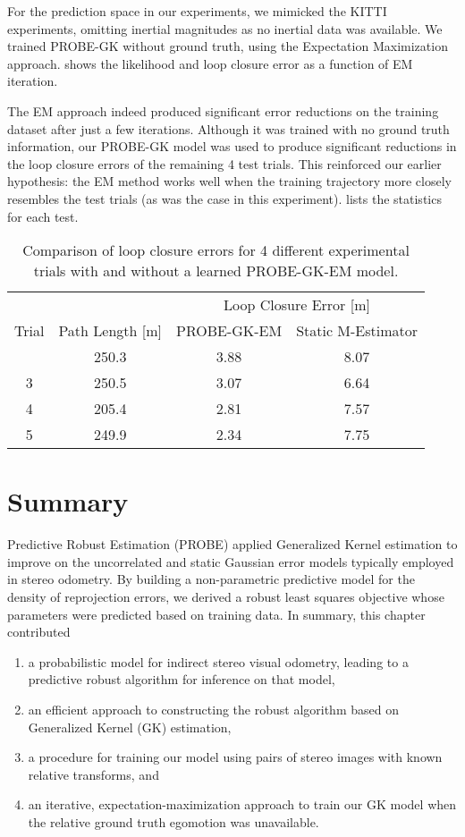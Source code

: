 For the prediction space in our experiments, we mimicked the KITTI experiments, omitting inertial magnitudes as no inertial data was available. We trained PROBE-GK without ground truth, using the Expectation Maximization approach.  shows the likelihood and loop closure error as a function of EM iteration. 

The EM approach indeed produced significant error reductions on the training dataset after just a few iterations.  Although  it was trained with no ground truth information, our PROBE-GK model was used to produce significant reductions in the loop closure errors of the remaining 4 test trials. This reinforced our earlier hypothesis: the EM method works well when the training trajectory more closely resembles the test trials (as was the case in this experiment).  lists the statistics for each test. 


\begin{table}
\centering
\caption{Comparison of loop closure errors for 4 different experimental trials
  with and without a learned PROBE-GK-EM model.}
\begin{tabular}{ c  c  c  c }
     & & \multicolumn{2}{c}{Loop Closure Error [m]}  \\ \cline{3-4} \T
    Trial & Path Length [m] & PROBE-GK-EM & Static M-Estimator \\    
      \hline \T	
  2 & 250.3 & 3.88 & 8.07 \\
  3 & 250.5 & 3.07 & 6.64 \\
  4 & 205.4 & 2.81 & 7.57 \\
  5 & 249.9 & 2.34 & 7.75 \\ \hline
\end{tabular}
\label{table:probe-gk_loop_closure_errors}
\end{table}


\section{Summary}

Predictive Robust Estimation (PROBE) applied Generalized Kernel estimation to improve on the uncorrelated and static Gaussian error models typically employed in stereo odometry. By building a non-parametric predictive model for the density of reprojection errors, we derived a robust least squares objective whose parameters were predicted based on training data. In summary, this chapter contributed
\begin{enumerate}
\item a probabilistic model for indirect stereo visual odometry, leading to a predictive robust algorithm for inference on that model,
\item an efficient approach to constructing the robust algorithm based on Generalized Kernel (GK) estimation,
\item a procedure for training our model using pairs of stereo images with known relative transforms, and
\item an iterative, expectation-maximization approach to train our GK model when the relative ground truth egomotion was unavailable.
\end{enumerate}

